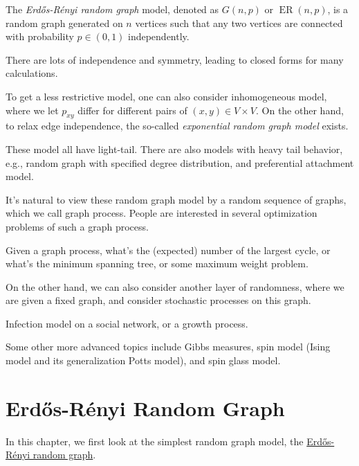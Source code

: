 \begin{definition}\label{def:Erdős-Rényi-random-graph}
	The \emph{Erdős-Rényi random graph} model, denoted as \(G(n, p)\) or \(\operatorname{ER}(n, p) \), is a random graph generated on \(n\) vertices such that any two vertices are connected with probability \(p \in (0, 1)\) independently.
\end{definition}

\begin{note}
	There are lots of independence and symmetry, leading to closed forms for many calculations.
\end{note}

To get a less restrictive model, one can also consider inhomogeneous model, where we let \(p_{xy}\) differ for different pairs of \((x , y) \in V \times V\). On the other hand,  to relax edge independence, the so-called \emph{exponential random graph model} exists.

\begin{remark}
	These model all have light-tail. There are also models with heavy tail behavior, e.g., random graph with specified degree distribution, and preferential attachment model.
\end{remark}

It's natural to view these random graph model by a random sequence of graphs, which we call graph process. People are interested in several optimization problems of such a graph process.

\begin{eg}
	Given a graph process, what's the (expected) number of the largest cycle, or what's the minimum spanning tree, or some maximum weight problem.
\end{eg}

On the other hand, we can also consider another layer of randomness, where we are given a fixed graph, and consider stochastic processes on this graph.

\begin{eg}
	Infection model on a social network, or a growth process.
\end{eg}

Some other more advanced topics include Gibbs measures, spin model (Ising model and its generalization Potts model), and spin glass model.

\chapter{Erdős-Rényi Random Graph}
In this chapter, we first look at the simplest random graph model, the \hyperref[def:Erdős-Rényi-random-graph]{Erdős-Rényi random graph}.


